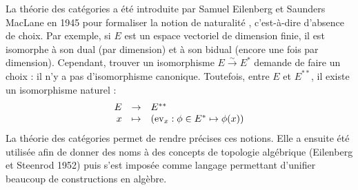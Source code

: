 \documentclass{article}
\newcommand{\applic}[4]{\begin{array}[t]{rcl}
#1 & \to & #2 \\
#3 & \mapsto & #4
\end{array}}
\theoremstyle{plain}
\theoremstyle{definition}
\theoremstyle{remark}
\begin{document}
La théorie des catégories a été introduite par Samuel Eilenberg et Saunders MacLane en 1945 pour formaliser la notion de \og naturalité \fg, c'est-à-dire d'absence de choix. Par exemple, si $E$ est un espace vectoriel de dimension finie, il est isomorphe à son dual (par dimension) et à son bidual (encore une fois par dimension). Cependant, trouver un isomorphisme $E \xrightarrow{\sim} E^*$ demande de faire un choix : il n'y a pas d'isomorphisme canonique. Toutefois, entre $E$ et $E^{**}$, il existe un isomorphisme \og naturel \fg : 
\[\applic{E}{E^{**}}{x}{(\mathrm{ev}_x : \phi \in E^* \mapsto \phi(x))}\]
La théorie des catégories permet de rendre précises ces notions. Elle a ensuite été utilisée afin de donner des noms à des concepts de topologie algébrique (Eilenberg et Steenrod 1952) puis s'est imposée comme langage permettant d'unifier beaucoup de constructions en algèbre.
\end{document}
